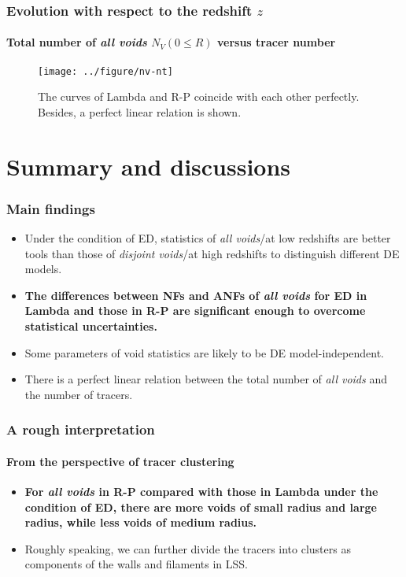 \documentclass{beamer}
\newtheorem{Narrow down the analysis}{Narrow down the analysis}
\begin{document}
\begin{frame}
	\frametitle{Evolution with respect to the redshift $z$}
	\framesubtitle{Total number of \textit{all voids} $N_{V}(0\leq R)$ versus tracer number}
	\pause
	\begin{figure}
\centering
\texttt{[image: ../figure/nv-nt]}
\caption{The curves of Lambda and R-P coincide with each other perfectly. Besides, a perfect linear relation is shown.}
\label{28}
\end{figure}
\end{frame}

\section{Summary and discussions} %
\begin{frame}
    \frametitle{Main findings}
    \begin{itemize}
    \pause \item Under the condition of ED, statistics of \textit{all voids}/at low redshifts are better tools than those of \textit{disjoint voids}/at high redshifts to distinguish different DE models.
    \pause \item \textbf{The differences between NFs and ANFs of \textit{all voids} for ED in Lambda and those in R-P are significant enough to overcome statistical uncertainties.}
    \pause \item Some parameters of void statistics are likely to be DE model-independent. 
    \pause \item There is a perfect linear relation between the total number of \textit{all voids} and the number of tracers.
    \end{itemize}
\end{frame}

\begin{frame}
	\frametitle{A rough interpretation}
	\framesubtitle{From the perspective of tracer clustering}
	\begin{itemize}
	\pause \item \textbf{For \textit{all voids} in R-P compared with those in Lambda under the condition of ED, there are more voids of small radius and large radius, while less voids of medium radius.}
	\pause \item Roughly speaking, we can further divide the tracers into clusters as components of the walls and filaments in LSS.
	\end{itemize}
\end{frame}
\end{document}
